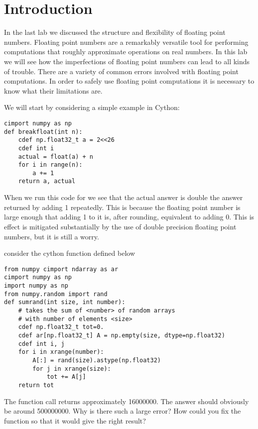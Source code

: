 \label{lab:breakfloat}

\section*{Introduction}

In the last lab we discussed the structure and flexibility of floating point numbers.
Floating point numbers are a remarkably versatile tool for performing computations that roughly approximate operations on real numbers.
In this lab we will see how the imperfections of floating point numbers can lead to all kinds of trouble.
There are a variety of common errors involved with floating point computations.
In order to safely use floating point computations it is necessary to know what their limitations are.

We will start by considering a simple example in Cython:

\begin{lstlisting}
cimport numpy as np
def breakfloat(int n):
    cdef np.float32_t a = 2<<26
    cdef int i
    actual = float(a) + n
    for i in range(n):
        a += 1
    return a, actual
\end{lstlisting}

When we run this code for  we see that the actual answer is double the answer returned by adding 1 repeatedly.
This is because the floating point number is large enough that adding 1 to it is, after rounding, equivalent to adding 0.
This is effect is mitigated substantially by the use of double precision floating point numbers, but it is still a worry.

\begin{problem}
consider the cython function defined below
\begin{lstlisting}
from numpy cimport ndarray as ar
cimport numpy as np
import numpy as np
from numpy.random import rand
def sumrand(int size, int number):
    # takes the sum of <number> of random arrays
    # with number of elements <size>
    cdef np.float32_t tot=0.
    cdef ar[np.float32_t] A = np.empty(size, dtype=np.float32)
    cdef int i, j
    for i in xrange(number):
        A[:] = rand(size).astype(np.float32)
        for j in xrange(size):
            tot += A[j]
    return tot
\end{lstlisting}
The function call  returns approximately 16000000.
The answer should obviously be around 500000000.
Why is there such a large error?
How could you fix the function so that it would give the right result?
\end{problem}
